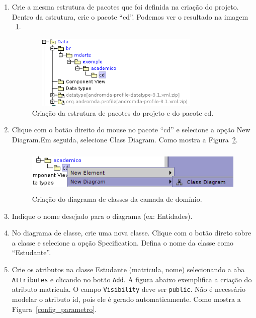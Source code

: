 \begin{enumerate}
\item Crie a mesma estrutura de pacotes que foi definida na criação do projeto.
Dentro da estrutura, crie o pacote “cd”. Podemos ver o resultado na imagem
~\ref{cria_estrutura_pacotes}. 
\begin{figure}[!htb]
	\centering
	\includegraphics[width=250pt,height=100pt]{imgs/tutorial-mdarte-0000.png}
	\caption{Criação da estrutura de pacotes do projeto e do pacote cd.}
	\label{cria_estrutura_pacotes}
\end{figure}
\item Clique com o botão direito do mouse no pacote “cd” e selecione a opção New
Diagram.Em seguida, selecione Class Diagram. Como mostra a
Figura~\ref{cria_diagrama_classe}.
\begin{figure}[!htb]
	\centering
	\includegraphics[width=400pt,height=60pt]{imgs/tutorial-mdarte-0001.png}
	\caption{Criação do diagrama de classes da camada de domínio.}
	\label{cria_diagrama_classe}
\end{figure}
	
\item Indique o nome desejado para o diagrama (ex: Entidades).
	
\item No diagrama de classe, crie uma nova classe. Clique com o botão direto
sobre a classe e selecione a opção Specification. Defina o nome da classe como
“Estudante”.
	
\item Crie os atributos na classe Estudante (matricula, nome) selecionando a aba
\texttt{Attributes} e clicando no botão \texttt{Add}. A figura abaixo exemplifica a criação do
atributo matricula. O campo \texttt{Visibility} deve ser \texttt{public}. Não é necessário modelar
o atributo id, pois ele é gerado automaticamente. Como mostra a
Figura~\ref{config_parametro}.


\end{enumerate}
